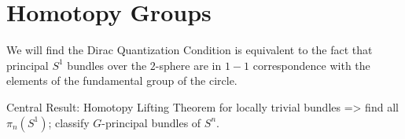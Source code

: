 \chapter{Homotopy Groups}

We will find the Dirac Quantization Condition is equivalent to the fact that principal $S^1$ bundles over the $2$-sphere are in $1-1$ correspondence with the elements of the fundamental group of the circle.

Central Result: Homotopy Lifting Theorem for locally trivial bundles => find all $\pi_n(S^1)$; classify $G$-principal bundles of $S^n$.